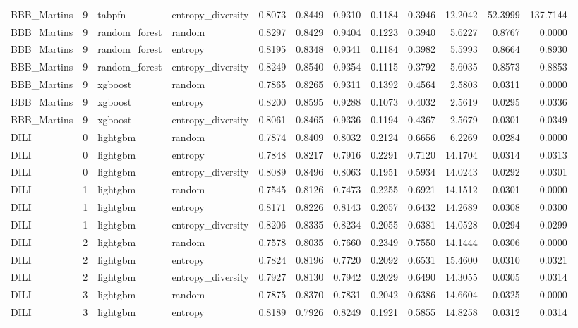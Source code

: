\begin{tabular}{lrllrrrrrrrr}
BBB_Martins & 9 & tabpfn & entropy_diversity & 0.8073 & 0.8449 & 0.9310 & 0.1184 & 0.3946 & 12.2042 & 52.3999 & 137.7144 \\
BBB_Martins & 9 & random_forest & random & 0.8297 & 0.8429 & 0.9404 & 0.1223 & 0.3940 & 5.6227 & 0.8767 & 0.0000 \\
BBB_Martins & 9 & random_forest & entropy & 0.8195 & 0.8348 & 0.9341 & 0.1184 & 0.3982 & 5.5993 & 0.8664 & 0.8930 \\
BBB_Martins & 9 & random_forest & entropy_diversity & 0.8249 & 0.8540 & 0.9354 & 0.1115 & 0.3792 & 5.6035 & 0.8573 & 0.8853 \\
BBB_Martins & 9 & xgboost & random & 0.7865 & 0.8265 & 0.9311 & 0.1392 & 0.4564 & 2.5803 & 0.0311 & 0.0000 \\
BBB_Martins & 9 & xgboost & entropy & 0.8200 & 0.8595 & 0.9288 & 0.1073 & 0.4032 & 2.5619 & 0.0295 & 0.0336 \\
BBB_Martins & 9 & xgboost & entropy_diversity & 0.8061 & 0.8465 & 0.9336 & 0.1194 & 0.4367 & 2.5679 & 0.0301 & 0.0349 \\
DILI & 0 & lightgbm & random & 0.7874 & 0.8409 & 0.8032 & 0.2124 & 0.6656 & 6.2269 & 0.0284 & 0.0000 \\
DILI & 0 & lightgbm & entropy & 0.7848 & 0.8217 & 0.7916 & 0.2291 & 0.7120 & 14.1704 & 0.0314 & 0.0313 \\
DILI & 0 & lightgbm & entropy_diversity & 0.8089 & 0.8496 & 0.8063 & 0.1951 & 0.5934 & 14.0243 & 0.0292 & 0.0301 \\
DILI & 1 & lightgbm & random & 0.7545 & 0.8126 & 0.7473 & 0.2255 & 0.6921 & 14.1512 & 0.0301 & 0.0000 \\
DILI & 1 & lightgbm & entropy & 0.8171 & 0.8226 & 0.8143 & 0.2057 & 0.6432 & 14.2689 & 0.0308 & 0.0300 \\
DILI & 1 & lightgbm & entropy_diversity & 0.8206 & 0.8335 & 0.8234 & 0.2055 & 0.6381 & 14.0528 & 0.0294 & 0.0299 \\
DILI & 2 & lightgbm & random & 0.7578 & 0.8035 & 0.7660 & 0.2349 & 0.7550 & 14.1444 & 0.0306 & 0.0000 \\
DILI & 2 & lightgbm & entropy & 0.7824 & 0.8196 & 0.7720 & 0.2092 & 0.6531 & 15.4600 & 0.0310 & 0.0321 \\
DILI & 2 & lightgbm & entropy_diversity & 0.7927 & 0.8130 & 0.7942 & 0.2029 & 0.6490 & 14.3055 & 0.0305 & 0.0314 \\
DILI & 3 & lightgbm & random & 0.7875 & 0.8370 & 0.7831 & 0.2042 & 0.6386 & 14.6604 & 0.0325 & 0.0000 \\
DILI & 3 & lightgbm & entropy & 0.8189 & 0.7926 & 0.8249 & 0.1921 & 0.5855 & 14.8258 & 0.0312 & 0.0314 \\

\end{tabular}
